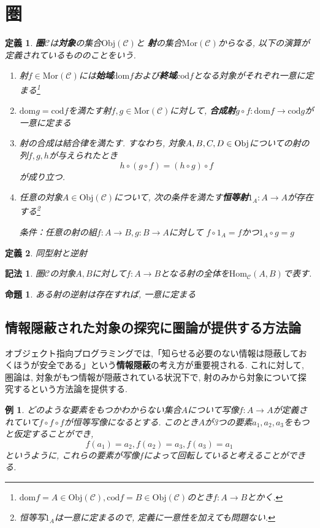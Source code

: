 \documentclass{jsbook}
\theoremstyle{plain}
\newtheorem{Def}{定義}[chapter]
\newtheorem{Notation}{記法}[chapter]
\newtheorem{Prop}{命題}[chapter]
\newtheorem{example}{例}[chapter]
\begin{document}
\section{圏}
\begin{Def}
{\bf 圏}$\mathscr{C}$は{\bf 対象}の集合$\mathrm{Obj}(\mathscr{C})$と
{\bf 射}の集合$\mathrm{Mor}(\mathscr{C})$からなる, 以下の演算が定義されているもののことをいう.
\begin{enumerate}
\item 射$f\in\mathrm{Mor}(\mathscr{C})$には{\bf 始域}$\mathrm{dom}f$および{\bf 終域}$\mathrm{cod}f$となる対象がそれぞれ一意に定まる\footnote{$\mathrm{dom}f=A\in\mathrm{Obj}(\mathscr{C}),\mathrm{cod}f=B\in\mathrm{Obj}(\mathscr{C})$のとき$f:A\rightarrow B$とかく.}
\item $\mathrm{dom} g=\mathrm{cod}f$を満たす射$f,g\in\mathrm{Mor}(\mathscr{C})$に対して,
{\bf 合成射}$g\circ f:\mathrm{dom}f\rightarrow\mathrm{cod}g$が一意に定まる
\item 射の合成は結合律を満たす. すなわち, 対象$A,B,C,D\in\rm{Obj}$についての射の列$f,g,h$が与えられたとき
\[
h\circ(g\circ f)=(h\circ g)\circ f
\]
が成り立つ.
\item 任意の対象$A\in\mathrm{Obj}(\mathscr{C})$について,
次の条件を満たす{\bf 恒等射}$1_{A}:A\rightarrow A$が存在する\footnote{恒等写$1_{A}$は一意に定まるので, 定義に一意性を加えても問題ない.}

条件：任意の射の組$f:A\rightarrow B, g:B\rightarrow A$に対して
$f\circ 1_A=f$かつ$1_A\circ g=g$
\end{enumerate}
\end{Def}
\begin{Def}
同型射と逆射
\end{Def}
\begin{Notation}
圏$\mathscr{C}$の対象$A,B$に対して$f:A\rightarrow B$となる射の全体を$\mathrm{Hom}_{\mathscr{C}}(A,B)$で表す.
\end{Notation}
\begin{Prop}
ある射の逆射は存在すれば, 一意に定まる
\end{Prop}
\subsection{情報隠蔽された対象の探究に圏論が提供する方法論}
オブジェクト指向プログラミングでは,「知らせる必要のない情報は隠蔽しておくほうが安全である」という{\bf 情報隠蔽}の考え方が重要視される.
これに対して, 圏論は, 対象がもつ情報が隠蔽されている状況下で, 射のみから対象について探究するという方法論を提供する.
\begin{example}
どのような要素をもつかわからない集合$A$について写像$f:A\rightarrow A$が定義されていて$f\circ f\circ f$が恒等写像になるとする.
このとき$A$が3つの要素$a_1,a_2,a_3$をもつと仮定することができ,
\[
f(a_1)=a_2, f(a_2)=a_3, 
f(a_3)=a_1
\]
というように, これらの要素が写像$f$によって回転していると考えることができる.
\end{example}
\end{document}
